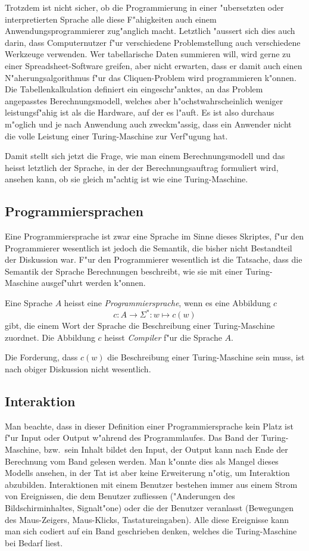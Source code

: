 Trotzdem ist nicht sicher, ob die Programmierung in einer "ubersetzten
oder interpretierten Sprache alle diese F"ahigkeiten auch einem
Anwendungsprogrammierer zug"anglich macht.
Letztlich "aussert sich dies auch darin, dass Computernutzer
f"ur verschiedene Problemstellung auch verschiedene Werkzeuge
verwenden. Wer tabellarische Daten summieren will, wird gerne
zu einer Spreadsheet-Software greifen, aber nicht erwarten, dass er
damit auch einen N"aherungsalgorithmus f"ur das Cliquen-Problem wird
programmieren k"onnen. Die Tabellenkalkulation definiert ein eingeschr"anktes,
an das Problem angepasstes Berechnungsmodell, welches aber
h"ochstwahrscheinlich weniger leistungsf"ahig ist als die Hardware, auf
der es l"auft. Es ist also durchaus m"oglich und je nach Anwendung auch
zweckm"assig, dass ein Anwender nicht die volle Leistung einer
Turing-Maschine zur Verf"ugung hat.

Damit stellt sich jetzt die Frage, wie man einem Berechnungsmodell und
das heisst letztlich der Sprache, in der der Berechnungsauftrag 
formuliert wird, ansehen kann, ob sie gleich m"achtig ist wie eine
Turing-Maschine.

\subsection{Programmiersprachen}
Eine Programmiersprache ist zwar eine Sprache im Sinne dieses Skriptes,
f"ur den Programmierer wesentlich ist jedoch die Semantik, die bisher
nicht Bestandteil der Diskussion war. F"ur den Programmierer wesentlich
ist die Tatsache, dass die Semantik der Sprache Berechnungen beschreibt,
wie sie mit einer Turing-Maschine ausgef"uhrt werden k"onnen.

\begin{definition}
Eine Sprache $A$ heisst eine {\em Programmiersprache}, wenn es eine Abbildung $c$
\[
c\colon A\to \Sigma^*\colon w\mapsto c(w)
\]
gibt, die einem Wort der Sprache die Beschreibung einer Turing-Maschine
zuordnet. Die Abbildung $c$ heisst {\em Compiler} f"ur die Sprache $A$.
\end{definition}
Die Forderung, dass $c(w)$ die Beschreibung einer Turing-Maschine
sein muss, ist nach obiger Diskussion nicht wesentlich.

\subsection{Interaktion}
Man beachte, dass in dieser Definition einer Programmiersprache kein Platz ist
f"ur Input oder Output w"ahrend des Programmlaufes.
Das Band der Turing-Maschine, bzw.~sein Inhalt bildet den Input, der Output
kann nach Ende der Berechnung vom Band gelesen werden.
Man k"onnte dies als Mangel dieses Modells ansehen, in der Tat ist aber 
keine Erweiterung n"otig, um Interaktion abzubilden.
Interaktionen mit einem Benutzer bestehen immer aus einem Strom von
Ereignissen, die dem Benutzer zufliessen ("Anderungen des Bildschirminhaltes,
Signalt"one) oder die der Benutzer veranlasst (Bewegungen des Maus-Zeigers,
Maus-Klicks, Tastatureingaben). Alle diese Ereignisse kann man sich codiert
auf ein Band geschrieben denken, welches die Turing-Maschine bei Bedarf
liest. 

